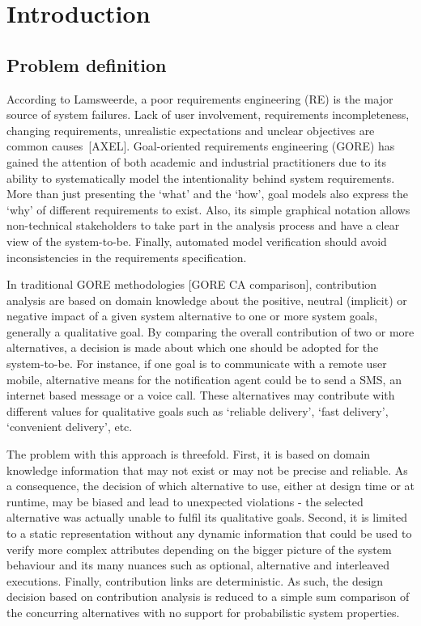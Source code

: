 \chapter{Introduction}\label{ch_introduction}%

\section{Problem definition}

According to Lamsweerde, a poor requirements engineering (RE) is the major source of system failures. Lack of user involvement, requirements incompleteness, changing requirements, unrealistic expectations and unclear objectives are common causes~[AXEL]. Goal-oriented requirements engineering (GORE) has gained the attention of both academic and industrial practitioners due to its ability to systematically model the intentionality behind system requirements. More than just presenting the `what' and the `how', goal models also express the `why' of different requirements to exist. Also, its simple graphical notation allows non-technical stakeholders to take part in the analysis process and have a clear view of the system-to-be. Finally, automated model verification should avoid inconsistencies in the requirements specification.


In traditional GORE methodologies [GORE CA comparison], contribution  analysis are based on domain knowledge about the positive, neutral (implicit) or negative impact of a given system alternative to one or more system goals, generally a qualitative goal. By  comparing the overall contribution of two or more alternatives, a decision is made about which one should be adopted for the system-to-be. For instance, if one goal is to communicate with a remote user mobile, alternative means for the notification agent could be to send a SMS, an internet based message or a voice call. These alternatives may contribute with different values for qualitative goals such as `reliable delivery', `fast delivery', `convenient delivery', etc. 

The problem with this approach is threefold. First, it is based on domain knowledge information that may not exist or may not be precise and reliable. As a consequence, the decision of which alternative to use, either at design time or at runtime, may be biased and lead to unexpected violations - the selected alternative was actually unable to fulfil its qualitative goals. Second, it is limited to a static representation without any dynamic information that could be used to verify more complex attributes depending on the bigger picture of the system behaviour and its many nuances such as optional, alternative and interleaved executions. Finally, contribution links are deterministic. As such, the design decision based on contribution analysis is reduced to a simple sum comparison of the concurring alternatives with no support for probabilistic system properties.

